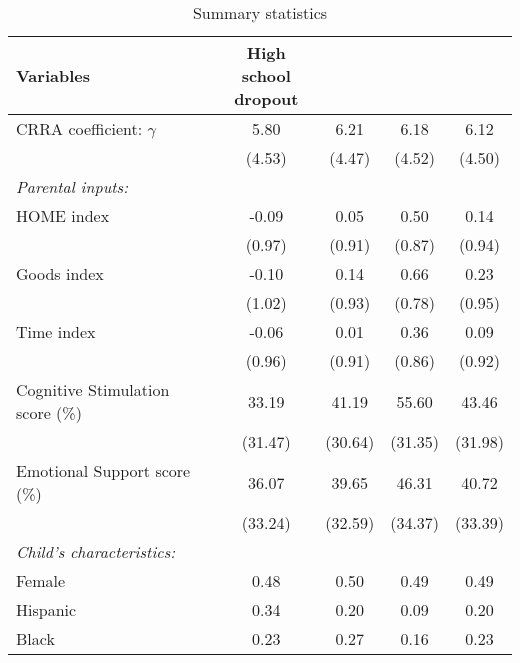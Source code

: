 \begin{table}[htbp]\centering \caption{Summary statistics \label{table:5-summary}}
\begin{threeparttable}
	\begin{tabular}{l*{4}{c}} \toprule
		\textbf{Variables}          &\thead{High school\\dropout}&\thead{High school}&\thead{College}&      \thead{Total}\\
		\midrule
		CRRA coefficient: $\gamma$            &        5.80&        6.21&        6.18&        6.12\\
		&      (4.53)&      (4.47)&      (4.52)&      (4.50)\\
		\addlinespace
		\textit{Parental inputs:} & & & & \\
		\addlinespace
		HOME index          &       -0.09&        0.05&        0.50&        0.14\\
		&      (0.97)&      (0.91)&      (0.87)&      (0.94)\\
		
		Goods index         &       -0.10&        0.14&        0.66&        0.23\\
		&      (1.02)&      (0.93)&      (0.78)&      (0.95)\\
		
		Time index          &       -0.06&        0.01&        0.36&        0.09\\
		&      (0.96)&      (0.91)&      (0.86)&      (0.92)\\
		
		Cognitive Stimulation score (\%)&       33.19&       41.19&       55.60&       43.46\\
		&     (31.47)&     (30.64)&     (31.35)&     (31.98)\\
		
		Emotional Support score (\%)&       36.07&       39.65&       46.31&       40.72\\
		&     (33.24)&     (32.59)&     (34.37)&     (33.39)\\
		
		\addlinespace
		\textit{Child's characteristics:} & & & & \\
		\addlinespace
		Female              &        0.48&        0.50&        0.49&        0.49\\
		
		Hispanic            &        0.34&        0.20&        0.09&        0.20\\
		
		Black               &        0.23&        0.27&        0.16&        0.23\\
		

\end{tabular}
\end{threeparttable}
\end{table}
